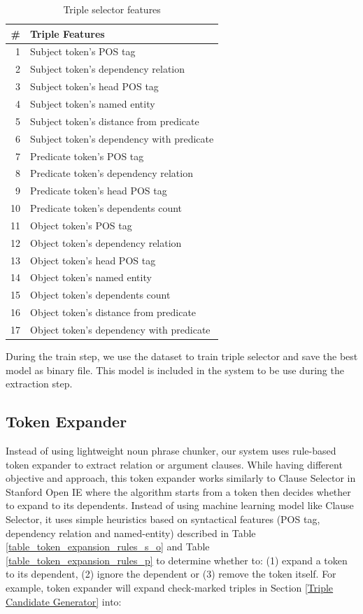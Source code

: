 \documentclass[conference,compsoc,12pt]{IEEEtran}
\begin{document}
\begin{table}[!t]
\renewcommand{\arraystretch}{1.5}
\caption{Triple selector features}
\label{table_models_features}
\centering
\begin{tabular}{r l}
\hline
\textbf{\#} & \textbf{Triple Features} \\
\hline
1 & Subject token's POS tag \\
2 & Subject token's dependency relation \\
3 & Subject token's head POS tag \\
4 & Subject token's named entity \\
5 & Subject token's distance from predicate \\
6 & Subject token's dependency with predicate \\
7 & Predicate token's POS tag \\
8 & Predicate token's dependency relation \\
9 & Predicate token's head POS tag \\
10 & Predicate token's dependents count \\
11 & Object token's POS tag \\
12 & Object token's dependency relation \\
13 & Object token's head POS tag \\
14 & Object token's named entity \\
15 & Object token's dependents count \\
16 & Object token's distance from predicate \\
17 & Object token's dependency with predicate \\
\end{tabular}
\end{table}

During the train step, we use the dataset to train triple selector and save the best model as binary file. This model is included in the system to be use during the extraction step.

\subsection{Token Expander}

Instead of using lightweight noun phrase chunker\cite{banko2007open}, our system uses rule-based token expander to extract relation or argument clauses. While having different objective and approach, this token expander works similarly to Clause Selector in Stanford Open IE\cite{angeli2015leveraging} where the algorithm starts from a token then decides whether to expand to its dependents. Instead of using machine learning model like Clause Selector, it uses simple heuristics based on syntactical features (POS tag, dependency relation and named-entity) described in Table \ref{table_token_expansion_rules_s_o} and Table \ref{table_token_expansion_rules_p} to determine whether to: (1) expand a token to its dependent, (2) ignore the dependent or (3) remove the token itself. For example, token expander will expand check-marked triples in Section \ref{Triple Candidate Generator} into:
\end{document}
